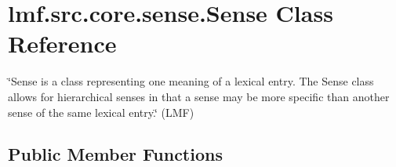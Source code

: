 \hypertarget{classlmf_1_1src_1_1core_1_1sense_1_1_sense}{\section{lmf.\+src.\+core.\+sense.\+Sense Class Reference}
\label{classlmf_1_1src_1_1core_1_1sense_1_1_sense}
}


\char`\"{}\+Sense is a class representing one meaning of a lexical entry. The Sense class allows for hierarchical senses in that a sense may be more specific than another sense of the same lexical entry.\char`\"{} (L\+M\+F)  


\subsection*{Public Member Functions}
